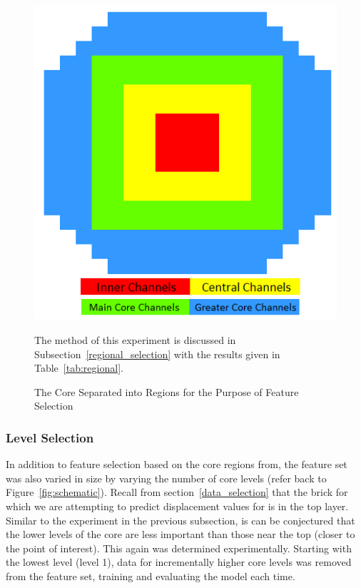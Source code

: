 \begin{figure}[h]
	\centering
	\includegraphics[scale=0.7]{Figures/core_regions.png}
	\caption{The Core Separated into Regions for the Purpose of Feature Selection} {The method of this experiment is discussed in Subsection~\ref{regional_selection} with the results given in Table~\ref{tab:regional}. }
	\label{fig:regions}
\end{figure}

\subsubsection{Level Selection} \label{level_selection}

In addition to feature selection based on the core regions from, the feature set was also varied in size by varying the number of core levels (refer back to Figure~\ref{fig:schematic}). Recall from section~\ref{data_selection} that the brick for which we are attempting to predict displacement values for is in the top layer. Similar to the experiment in the previous subsection, is can be conjectured that the lower levels of the core are less important than those near the top (closer to the point of interest). This again was determined experimentally. Starting with the lowest level (level 1), data for incrementally higher core levels was removed from the feature set, training and evaluating the model each time. 



